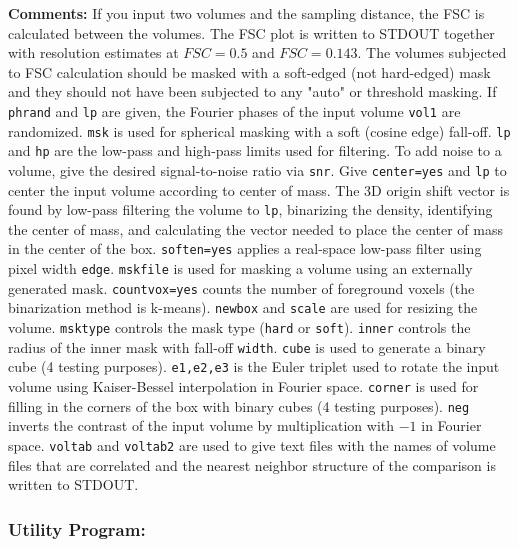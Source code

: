 \noindent\textbf{Comments:} If you input two volumes and the sampling distance, the FSC is calculated between the volumes. The FSC plot is written to STDOUT together with resolution estimates at $FSC=0.5$ and $FSC=0.143$. The volumes subjected to FSC calculation should be masked with a soft-edged (not hard-edged) mask and they should not have been subjected to any "auto" or threshold masking. If \texttt{phrand} and \texttt{lp} are given, the Fourier phases of the input volume \texttt{vol1} are randomized. \texttt{msk} is used for spherical masking with a soft (cosine edge) fall-off. \texttt{lp} and \texttt{hp} are the low-pass and high-pass limits used for filtering. To add noise to a volume, give the desired signal-to-noise ratio via \texttt{snr}. Give \texttt{center=yes} and \texttt{lp} to center the input volume according to center of mass. The 3D origin shift vector is found by low-pass filtering the volume to \texttt{lp}, binarizing the density, identifying the center of mass, and calculating the vector needed to place the center of mass in the center of the box. \texttt{soften=yes} applies a real-space low-pass filter using pixel width \texttt{edge}. \texttt{mskfile} is used for masking a volume using an externally generated mask. \texttt{countvox=yes} counts the number of foreground voxels (the binarization method is k-means). \texttt{newbox} and \texttt{scale} are used for resizing the volume. \texttt{msktype} controls the mask type (\texttt{hard} or \texttt{soft}). \texttt{inner} controls the radius of the inner mask with fall-off \texttt{width}. \texttt{cube} is used to generate a binary cube (4 testing purposes). \texttt{e1,e2,e3} is the Euler triplet used to rotate the input volume using Kaiser-Bessel interpolation in Fourier space. \texttt{corner} is used for filling in the corners of the box with binary cubes (4 testing purposes). \texttt{neg} inverts the contrast of the input volume by multiplication with $-1$ in Fourier space. \texttt{voltab} and \texttt{voltab2} are used to give text files with the names of volume files that are correlated and the nearest neighbor structure of the comparison is written to STDOUT.

\subsubsection{Utility Program: }
\label{volume_smat}
\shellctd{[lp=<low-pass limit(in A)>] [msk=<mask radius(in pixels)>] [hp=<high-pass}
\shellctd{limit(in A)>] [nthr=<nr of OpenMP threads\{1\}>]}

